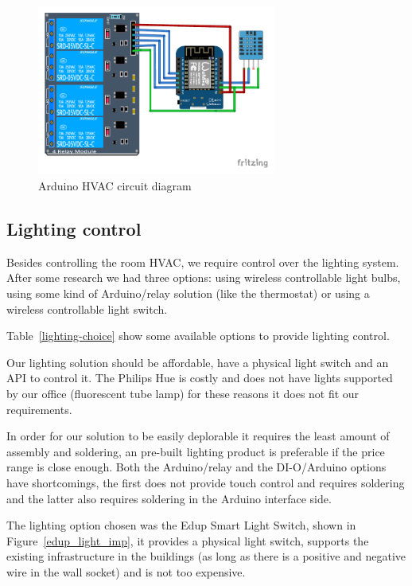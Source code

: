 \begin{figure}[h]
\centering
\includegraphics[width=0.7\textwidth]{Figures/arduino_imp}
\caption{Arduino HVAC circuit diagram}
\label{arduino_imp}
\end{figure}



\subsection{Lighting control}
Besides controlling the room \ac{HVAC}, we require control over the lighting system. After some research we had three options: using wireless controllable light bulbs, using some kind of Arduino/relay solution (like the thermostat) or using a wireless controllable light switch.

Table~\ref{lighting-choice} show some available options to provide lighting control.

Our lighting solution should be affordable, have a physical light switch and an API to control it. The Philips Hue is costly and does not have lights supported by our office (fluorescent tube lamp) for these reasons it does not fit our requirements.

In order for our solution to be easily deplorable it requires the least amount of assembly and soldering, an pre-built lighting product is preferable if the price range is close enough. Both the Arduino/relay and the DI-O/Arduino options have shortcomings, the first does not provide touch control and requires soldering and the latter also requires soldering in the Arduino interface side.

The lighting option chosen was the Edup Smart Light Switch, shown in Figure~\ref{edup_light_imp},  it provides a physical light switch, supports the existing infrastructure in the buildings (as long as there is a positive and negative wire in the wall socket) and is not too expensive.


